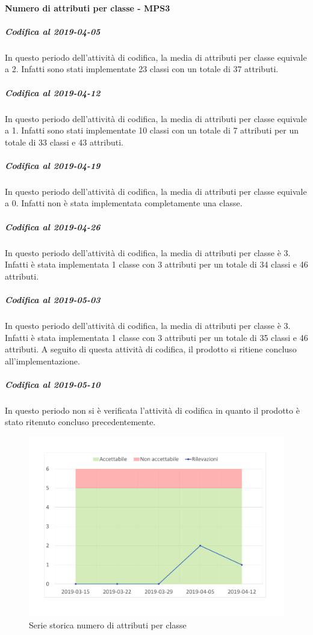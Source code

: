 \paragraph{Numero di attributi per classe - MPS3}
\subparagraph{Codifica al 2019-04-05}
In questo periodo dell'attività di codifica, la media di attributi per classe equivale a 2. Infatti sono stati implementate 23 classi con un totale di 37 attributi.

\subparagraph{Codifica al 2019-04-12}
In questo periodo dell'attività di codifica, la media di attributi per classe equivale a 1. Infatti sono stati implementate 10 classi con un totale di 7 attributi per un totale di 33 classi e 43 attributi.

\subparagraph{Codifica al 2019-04-19}
In questo periodo dell'attività di codifica, la media di attributi per classe equivale a 0. Infatti non è stata implementata completamente una classe.

\subparagraph{Codifica al 2019-04-26}
In questo periodo dell'attività di codifica, la media di attributi per classe è 3. Infatti è stata implementata 1 classe con 3 attributi per un totale di 34 classi e 46 attributi.

\subparagraph{Codifica al 2019-05-03}
In questo periodo dell'attività di codifica, la media di attributi per classe è 3. Infatti è stata implementata 1 classe con 3 attributi per un totale di 35 classi e 46 attributi.
A seguito di questa attività di codifica, il prodotto si ritiene concluso all'implementazione.

\subparagraph{Codifica al 2019-05-10}
In questo periodo non si è verificata l'attività di codifica in quanto il prodotto è stato ritenuto concluso precedentemente.

\begin{figure}[H]
	\centering
	\includegraphics[scale=0.6]{images/resoconto/MPS3Chart.pdf}
	\caption{Serie storica numero di attributi per classe}	
\end{figure}

